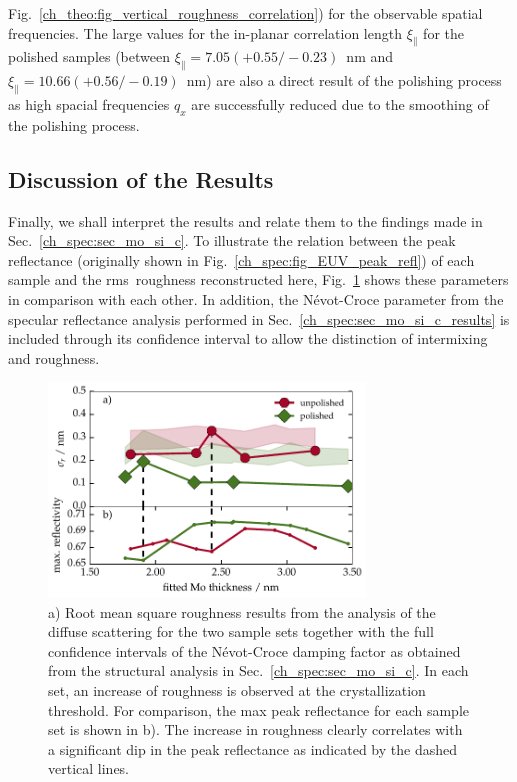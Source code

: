 Fig.~\ref{ch_theo:fig_vertical_roughness_correlation}) for the observable spatial frequencies. The large values for the in-planar correlation length $\xi_\parallel$ for the polished samples (between $\xi_\parallel = 7.05(+0.55/-0.23)$~nm and $\xi_\parallel = 10.66(+0.56/-0.19)$~nm) are also a direct result of the polishing process as high spacial frequencies $q_x$ are successfully reduced due to the smoothing of the polishing process.

\subsection{Discussion of the Results}
Finally, we shall interpret the results and relate them to the findings made in Sec.~\ref{ch_spec:sec_mo_si_c}. To illustrate the relation between the peak reflectance (originally shown in Fig.~\ref{ch_spec:fig_EUV_peak_refl}) of each sample and the \gls{rms}~roughness reconstructed here, Fig.~\ref{ch_diff:fig_Mo_Si_C_PSD_results} shows these parameters in comparison with each other. In addition, the N\'{e}vot-Croce parameter from the specular reflectance analysis performed in Sec.~\ref{ch_spec:sec_mo_si_c_results} is included through its confidence interval to allow the distinction of intermixing and roughness.
\begin{figure}[htbp]
\centering
\includegraphics[width=0.75\textwidth]{img/MoSiC_PSD_results}
\caption[Root mean square roughness and N\'{e}vot-Croce factor results from the analysis of the diffuse scattering for the two sample sets.]{a) Root mean square roughness results from the analysis of the diffuse scattering for the two sample sets together with the full confidence intervals of the N\'{e}vot-Croce damping factor as obtained from the structural analysis in Sec.~\ref{ch_spec:sec_mo_si_c}. In each set, an increase of roughness is observed at the crystallization threshold. For comparison, the max peak reflectance for each sample set is shown in b). The increase in roughness clearly correlates with a significant dip in the peak reflectance as indicated by the dashed vertical lines.}
\label{ch_diff:fig_Mo_Si_C_PSD_results}
\end{figure}

